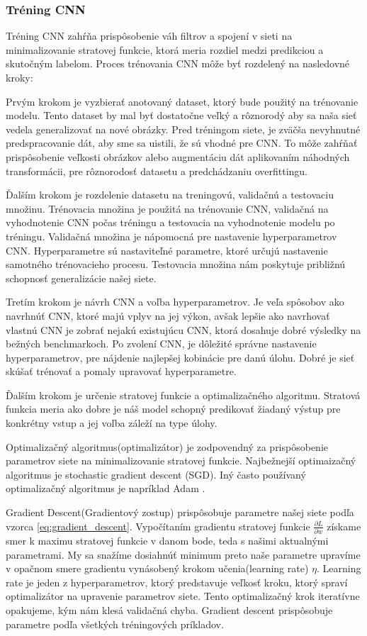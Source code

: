 \subsubsection{Tréning CNN}
\hspace{\parindent}Tréning CNN zahŕňa prispôsobenie váh filtrov a spojení v sieti na minimalizovanie stratovej funkcie, ktorá meria rozdiel medzi predikciou a skutočným labelom. Proces trénovania CNN môže byť rozdelený na nasledovné kroky:

Prvým krokom je vyzbierať anotovaný dataset, ktorý bude použitý na trénovanie modelu. Tento dataset by mal byť dostatočne veľký a rôznorodý aby sa naša sieť vedela generalizovať na nové obrázky. Pred tréningom siete, je zväčša nevyhnutné predspracovanie dát, aby sme sa uistili, že sú vhodné pre CNN. To môže zahŕňať prispôsobenie veľkosti obrázkov alebo augmentáciu dát aplikovaním náhodných transformácii, pre rôznorodosť datasetu a predchádzaniu overfittingu. 

Ďalším krokom je rozdelenie datasetu na treningovú, validačnú a testovaciu množinu. Trénovacia množina je použitá na trénovanie CNN, validačná na vyhodnotenie CNN počas tréningu a testovacia na vyhodnotenie modelu po tréningu. Validačná množina je nápomocná pre nastavenie hyperparametrov CNN. Hyperparametre sú nastaviteľné parametre, ktoré určujú nastavenie samotného trénovacieho procesu. Testovacia množina nám poskytuje približnú schopnosť generalizácie našej siete. 

Tretím krokom je návrh CNN a voľba hyperparametrov. Je veľa spôsobov ako navrhnúť CNN, ktoré majú vplyv na jej výkon, avšak lepšie ako navrhovať vlastnú CNN je zobrať nejakú existujúcu CNN, ktorá dosahuje dobré výsledky na bežných benchmarkoch. Po zvolení CNN, je dôležité správne nastavenie hyperparametrov, pre nájdenie najlepšej kobinácie pre danú úlohu. Dobré je sieť skúšať trénovať a pomaly upravovať hyperparametre.

Ďalším krokom je určenie stratovej funkcie a optimalizačného algoritmu. Stratová funkcia meria ako dobre je náš model schopný predikovať žiadaný výstup pre konkrétny vstup a jej voľba záleží na type úlohy. 

Optimalizačný algoritmus(optimalizátor) je zodpovendný za prispôsobenie parametrov siete na minimalizovanie stratovej funkcie. Najbežnejší optimaizačný algoritmus je stochastic gradient descent (SGD). Iný často používaný optimalizačný algoritmus je napríklad Adam \cite{Adam}. 

Gradient Descent(Gradientový zostup) prispôsobuje parametre našej siete podľa vzorca \ref{eq:gradient_descent}. Vypočítaním gradientu stratovej funkcie $\frac{\partial L}{\partial w}$ získame smer k maximu stratovej funkcie v danom bode, teda s našimi aktualnými parametrami. My sa snažíme dosiahnúť minimum preto naše parametre upravíme v opačnom smere gradientu vynásobený krokom učenia(learning rate) $\eta$. Learning rate je jeden z hyperparametrov, ktorý predstavuje veľkosť kroku, ktorý spraví optimalizátor na upravenie parametrov siete. Tento optimalizačný krok iteratívne opakujeme, kým nám klesá validačná chyba. Gradient descent prispôsobuje parametre podľa všetkých tréningových príkladov.

